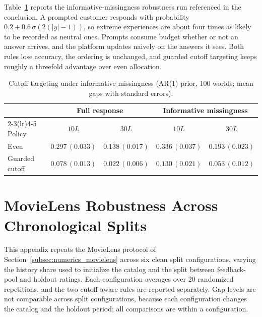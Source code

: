 \documentclass[11pt]{article}
\theoremstyle{definition}
\theoremstyle{remark}
\newcommand{\1}{\mathbf{1}}
\begin{document}
Table~\ref{tab:missingness} reports the informative-missingness
robustness run referenced in the conclusion. A prompted customer
responds with probability \(0.2+0.6\,\sigma(2(|y|-1))\), so extreme
experiences are about four times as likely to be recorded as neutral
ones. Prompts consume budget whether or not an answer arrives, and the
platform updates naively on the answers it sees. Both rules lose
accuracy, the ordering is unchanged, and guarded cutoff targeting keeps
roughly a threefold advantage over even allocation.

\begin{table}[h!]
\centering
\scriptsize
\setlength{\tabcolsep}{5pt}
\begin{tabular}{lcccc}
\toprule
 & \multicolumn{2}{c}{Full response} & \multicolumn{2}{c}{Informative missingness} \\
\cmidrule(lr){2-3}\cmidrule(lr){4-5}
Policy & $10L$ & $30L$ & $10L$ & $30L$ \\
\midrule
Even              & $0.297\,(0.033)$ & $0.138\,(0.017)$ & $0.336\,(0.037)$ & $0.193\,(0.023)$ \\
Guarded cutoff & $0.078\,(0.013)$ & $0.022\,(0.006)$ & $0.130\,(0.021)$ & $0.053\,(0.012)$ \\
\bottomrule
\end{tabular}
\caption{Cutoff targeting under informative missingness (AR(1) prior, 100 worlds; mean gaps with standard errors).}
\label{tab:missingness}
\end{table}

\section{MovieLens Robustness Across Chronological Splits}
\label{app:movielens-splits}

This appendix repeats the MovieLens protocol of
Section~\ref{subsec:numerics_movielens} across six clean split
configurations, varying the history share used to initialize the
catalog and the split between feedback-pool and holdout ratings. Each
configuration averages over \(20\) randomized repetitions, and the two
cutoff-aware rules are reported separately. Gap levels are not
comparable across split configurations, because each configuration
changes the catalog and the holdout period; all comparisons are within
a configuration.
\end{document}
